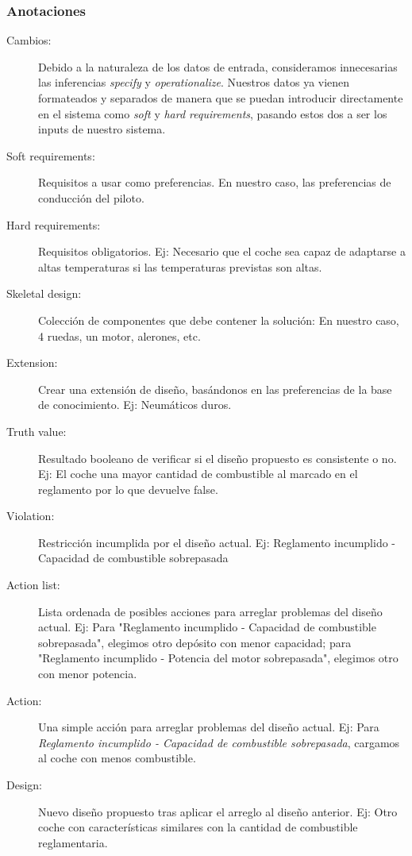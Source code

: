 \documentclass[12pt,a4paper,twoside,spanish]{article}      %
\begin{document}
\subsubsection {Anotaciones}
\begin {description}
    \item [Cambios:] Debido a la naturaleza de los datos de entrada, consideramos innecesarias las inferencias \textit {specify} y \textit {operationalize}. Nuestros datos ya vienen formateados y separados de manera que se puedan introducir directamente en el sistema como \textit {soft} y \textit {hard requirements}, pasando estos dos a ser los inputs de nuestro sistema.
    \item [Soft requirements:] Requisitos a usar como preferencias. En nuestro caso, las preferencias de conducción del piloto.
    \item [Hard requirements:] Requisitos obligatorios. Ej: Necesario que el coche sea capaz de adaptarse a altas temperaturas si las temperaturas previstas son altas.
    \item [Skeletal design:] Colección de componentes que debe contener la solución: En nuestro caso, 4 ruedas, un motor, alerones, etc.
    \item [Extension:] Crear una extensión de diseño, basándonos en las preferencias de la base de conocimiento. Ej: Neumáticos duros.
    \item [Truth value:] Resultado booleano de verificar si el diseño propuesto es consistente o no. Ej: El coche una mayor cantidad de combustible al marcado en el reglamento por lo que devuelve false.
    \item [Violation:] Restricción incumplida por el diseño actual. Ej: Reglamento incumplido - Capacidad de combustible sobrepasada
    \item [Action list:] Lista ordenada de posibles acciones para arreglar problemas del diseño actual. Ej: Para "Reglamento incumplido - Capacidad de combustible sobrepasada", elegimos otro depósito con menor capacidad; para "Reglamento incumplido - Potencia del motor sobrepasada", elegimos otro con menor potencia.
    \item [Action:] Una simple acción para arreglar problemas del diseño actual. Ej: Para \emph{Reglamento incumplido - Capacidad de combustible sobrepasada}, cargamos al coche con menos combustible.
    \item [Design:] Nuevo diseño propuesto tras aplicar el arreglo al diseño anterior. Ej: Otro coche con características similares con la cantidad de combustible reglamentaria.
\end {description}
\end{document}
